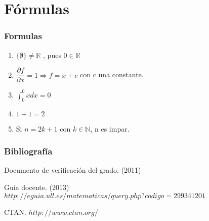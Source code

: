 \documentclass{beamer}
\begin{document}
\section{Fórmulas} 

\begin{frame}
  \frametitle{Formulas} 

\begin{example}
\begin{enumerate}
\item $ \{\emptyset\} \neq \mathbb{R} $ , pues $ 0 \in  \mathbb{R}$
\item $\dfrac {\partial f} {\partial x}=1 \Rightarrow f=x+c$ con c una constante.
\item $\int _{0}^{0} x dx =0$
\item $1+1=2$
\item Si $n=2k+1$ con $ k\in \mathbb{N}$, n es impar.
\end{enumerate}

\end{example}


\end{frame}

\begin{frame}
  \frametitle{Bibliografía}

  \begin{thebibliography}{10}

    \beamertemplatebookbibitems
    Documento de verificación del grado. 
    (2011) 

    \beamertemplatebookbibitems
    Guía docente. 
    (2013) 
    {\small $http://eguia.ull.es/matematicas/query.php?codigo=299341201$}

    \beamertemplatebookbibitems
    CTAN. {\small $http://www.ctan.org/$}

  \end{thebibliography}
\end{frame}


\end{document}
